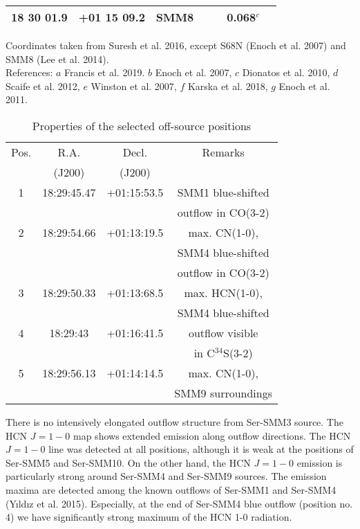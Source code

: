 \documentclass{aa}
\begin{document}
\begin{table*}
\begin{tabular}{c c c c c c c}
18 30 01.9 & +01 15 09.2 & SMM8 & & & 0.068$^c$ & \\
\hline
\end{tabular}
\begin{flushleft}
Coordinates taken from Suresh et al. 2016, except S68N (Enoch et al. 2007) and SMM8 (Lee et al. 2014).\\
References: $a$ Francis et al. 2019. $b$ Enoch et al. 2007, $c$ Dionatos et al. 2010, $d$ Scaife et al. 2012, $e$ Winston et al. 2007, $f$ Karska et al. 2018, $g$ Enoch et al. 2011. \\
\end{flushleft}
\end{table*}

\begin{table}
\caption{Properties of the selected off-source positions}             %
\label{table:3}      %
\centering                          %
\begin{tabular}{c c c c} 
\hline\hline 
Pos. & R.A. & Decl. & Remarks\\
 & (J200) & (J200) & \\
\hline
1 & 18:29:45.47 & +01:15:53.5 & SMM1 blue-shifted \\
 & & & outflow in CO(3-2)\\
\hline
2 & 18:29:54.66 & +01:13:19.5 & max. CN(1-0), \\
 & & & SMM4 blue-shifted \\
 & & & outflow in CO(3-2)\\
\hline
3 & 18:29:50.33 & +01:13:68.5 & max. HCN(1-0), \\
 & & & SMM4 blue-shifted \\
\hline
4 & 18:29:43 & +01:16:41.5 & outflow visible \\
 & & &  in C$^{34}$S(3-2)\\
\hline
5 & 18:29:56.13 & +01:14:14.5 & max. CN(1-0), \\
 & & & SMM9 surroundings\\
\hline
\end{tabular}
\end{table}

There is no intensively elongated outflow structure from Ser-SMM3 source. The HCN $J=1-0$ map shows extended emission along outflow directions. The HCN $J=1-0$ line was detected at all positions, although it is weak at the positions of Ser-SMM5 and Ser-SMM10. On the other hand, the HCN $J=1-0$ emission is particularly strong around Ser-SMM4 and Ser-SMM9 sources. The emission maxima are detected among the known outflows of Ser-SMM1 and Ser-SMM4 (Y{\i}ld{\i}z et al. 2015). Especially, at the end of Ser-SMM4 blue outflow (position no. 4) we have significantly strong maximum of the HCN 1-0 radiation. 
\end{document}
